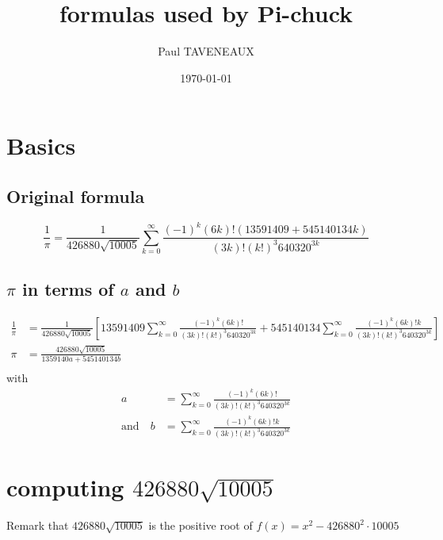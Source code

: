 \documentclass[fleqn]{report}
\title{formulas used by Pi-chuck}
\author{Paul TAVENEAUX}
\date{\today}
\begin{document}
\maketitle
\newpage

\chapter{Basics}

\section{Original formula}
\[
  \frac{1}{\pi} = \frac{1}{426880\sqrt{10005}}\sum_{ k = 0 }^{\infty}\frac{{(-1)}^k(6k)!(13591409 + 545140134k)}{(3k)!{(k!)}^{3}640320^{3k}}
\]

\section{$\pi$ in terms of $a$ and $b$}

\begin{align*}
  \frac{1}{\pi} & = \frac{1}{426880\sqrt{10005}}\left[13591409\sum_{k = 0}^{\infty}\frac{{(-1)}^k(6k)!}{(3k)!{(k!)}^{3}640320^{3k}} + 545140134\sum_{k = 0}^{\infty}\frac{{(-1)}^k(6k)!k}{(3k)!{(k!)}^{3}640320^{3k}}\right] \\
  \pi           & = \frac{426880\sqrt{10005}}{1359140a + 545140134b}                                                                                                                                                         \\
\end{align*}
with
\begin{align*}
  a                  & = \sum_{k = 0}^{\infty}\frac{{(-1)}^k(6k)! }{(3k)!{(k!)}^{3}640320^{3k}} \\
  \text{and} \quad b & = \sum_{k = 0}^{\infty}\frac{{(-1)}^k(6k)!k}{(3k)!{(k!)}^{3}640320^{3k}}
\end{align*}

\chapter{computing $ 426880\sqrt{10005} $}

Remark that $ 426880 \sqrt{10005} $ is the positive root of $ f(x) = x^2
  -426880^2 \cdot 10005$ 
\end{document}
